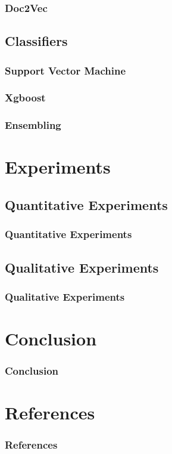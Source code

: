 \documentclass{beamer}
\begin{document}
\begin{frame}
\frametitle{Doc2Vec}

\end{frame}

\subsection{Classifiers}

\begin{frame}
\frametitle{Support Vector Machine}

\end{frame}

\begin{frame}
\frametitle{Xgboost}

\end{frame}

\begin{frame}
\frametitle{Ensembling}

\end{frame}

\section{Experiments}

\subsection{Quantitative Experiments}

\begin{frame}
\frametitle{Quantitative Experiments}

\end{frame}

\subsection{Qualitative Experiments}

\begin{frame}
\frametitle{Qualitative Experiments}

\end{frame}

\section{Conclusion}

\begin{frame}
\frametitle{Conclusion}

\end{frame}

\section*{References}

\begin{frame}[t,allowframebreaks]
\frametitle{References}
{\tiny

}
\end{frame}
 
\end{document}

